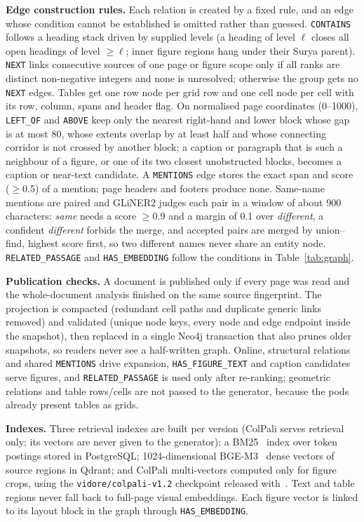 \documentclass[runningheads]{llncs}
\begin{document}
\textbf{Edge construction rules.} Each relation is created by a fixed rule, and an edge whose condition cannot be established is omitted rather than guessed. \texttt{CONTAINS} follows a heading stack driven by supplied levels (a heading of level $\ell$ closes all open headings of level $\geq\ell$; inner figure regions hang under their Surya parent). \texttt{NEXT} links consecutive sources of one page or figure scope only if all ranks are distinct non-negative integers and none is unresolved; otherwise the group gets no \texttt{NEXT} edges. Tables get one row node per grid row and one cell node per cell with its row, column, spans and header flag. On normalised page coordinates (0--1000), \texttt{LEFT\_OF} and \texttt{ABOVE} keep only the nearest right-hand and lower block whose gap is at most 80, whose extents overlap by at least half and whose connecting corridor is not crossed by another block; a caption or paragraph that is such a neighbour of a figure, or one of its two closest unobstructed blocks, becomes a caption or near-text candidate. A \texttt{MENTIONS} edge stores the exact span and score ($\geq$0.5) of a mention; page headers and footers produce none. Same-name mentions are paired and GLiNER2 judges each pair in a window of about 900 characters: \emph{same} needs a score $\geq$0.9 and a margin of 0.1 over \emph{different}, a confident \emph{different} forbids the merge, and accepted pairs are merged by union--find, highest score first, so two different names never share an entity node. \texttt{RELATED\_PASSAGE} and \texttt{HAS\_EMBEDDING} follow the conditions in Table~\ref{tab:graph}.

\textbf{Publication checks.} A document is published only if every page was read and the whole-document analysis finished on the same source fingerprint. The projection is compacted (redundant cell paths and duplicate generic links removed) and validated (unique node keys, every node and edge endpoint inside the snapshot), then replaced in a single Neo4j transaction that also prunes older snapshots, so readers never see a half-written graph. Online, structural relations and shared \texttt{MENTIONS} drive expansion, \texttt{HAS\_FIGURE\_TEXT} and caption candidates serve figures, and \texttt{RELATED\_PASSAGE} is used only after re-ranking; geometric relations and table rows/cells are not passed to the generator, because the pods already present tables as grids.

\textbf{Indexes.} Three retrieval indexes are built per version (ColPali serves retrieval only; its vectors are never given to the generator): a BM25~\cite{robertson2009bm25} index over token postings stored in PostgreSQL; 1024-dimensional BGE-M3~\cite{chen2024bgem3} dense vectors of source regions in Qdrant; and ColPali multi-vectors computed only for figure crops, using the \texttt{vidore/colpali-v1.2} checkpoint released with~\cite{faysse2025colpali}. Text and table regions never fall back to full-page visual embeddings. Each figure vector is linked to its layout block in the graph through \texttt{HAS\_EMBEDDING}.
\end{document}
